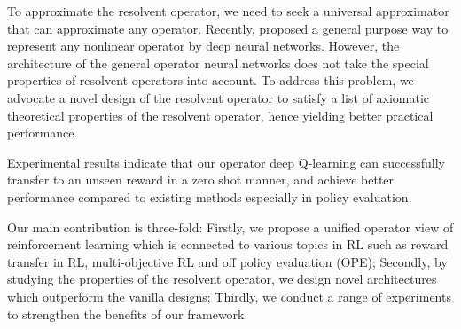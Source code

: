 To approximate the resolvent operator, we need to seek a universal approximator that can approximate any operator.
Recently, \citet{lu2019deeponet} proposed a general purpose way to represent any nonlinear operator by deep neural networks.
However, the  architecture of the general operator neural networks does not take the special properties of resolvent operators into account. 
To address this problem, we advocate a novel design of the resolvent operator
to satisfy a list of axiomatic theoretical properties of the resolvent operator, hence yielding better practical performance. 



Experimental results indicate that our operator deep Q-learning can successfully transfer to an unseen reward in a zero shot manner, and achieve better performance compared to 
existing methods
especially in policy evaluation.

Our main contribution is three-fold: 
Firstly, we propose a unified operator view of reinforcement learning which is connected to various topics in RL such as reward transfer in RL, multi-objective RL and off policy evaluation (OPE);
Secondly, by studying the properties of the resolvent operator, we design novel architectures which outperform the vanilla designs;
Thirdly, we conduct a range of experiments to strengthen the benefits of our framework.